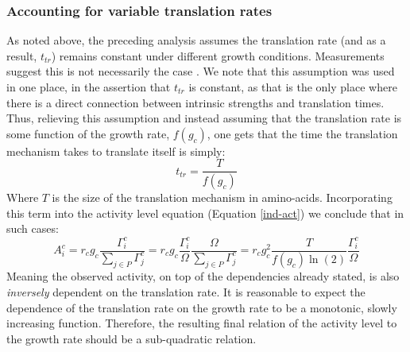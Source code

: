 \documentclass[a4page,notitlepage]{article}
\begin{document}
\subsubsection{Accounting for variable translation rates}
\label{nonconst-trans}
As noted above, the preceding analysis assumes the translation rate (and as a result, $t_{tr}$) remains constant under different growth conditions.
Measurements suggest this is not necessarily the case \parencite{Liang2000}.
We note that this assumption was used in one place, in the assertion that $t_{tr}$ is constant, as that is the only place where there is a direct connection between intrinsic strengths and translation times.
Thus, relieving this assumption and instead assuming that the translation rate is some function of the growth rate, $f(g_c)$, one gets that the time the translation mechanism takes to translate itself is simply:
\begin{equation}
t_{tr}=\frac{T}{f(g_c)}
\end{equation}
Where $T$ is the size of the translation mechanism in amino-acids.
Incorporating this term into the activity level equation (Equation \ref{ind-act}) we conclude that in such cases:
\begin{equation}
A^c_i=r_c g_c \frac{\Gamma^c_i}{\sum_{j\in P}\Gamma^c_j}=r_c g_c \frac{\Gamma^c_i}{\Omega}\frac{\Omega}{\sum_{j\in P}\Gamma^c_j}=r_c g_c^2\frac{T}{f(g_c)\ln(2)}\frac{\Gamma^c_i}{\Omega}
\end{equation}
Meaning the observed activity, on top of the dependencies already stated, is also \emph{inversely} dependent on the translation rate.
It is reasonable to expect the dependence of the translation rate on the growth rate to be a monotonic, slowly increasing function.
Therefore, the resulting final relation of the activity level to the growth rate should be a sub-quadratic relation.
\end{document}
